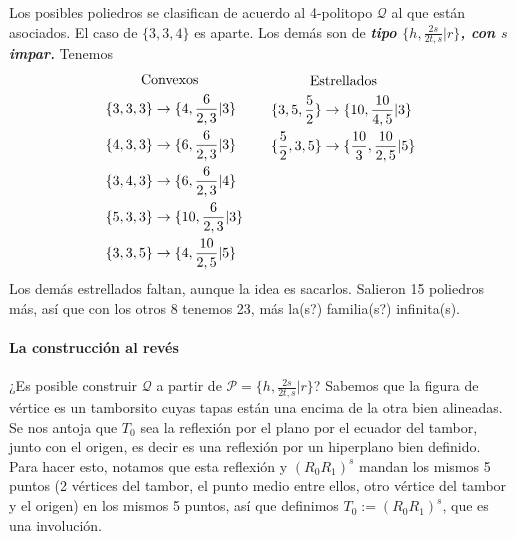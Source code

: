 \documentclass[spanish]{article}
\theoremstyle{definition}
\newcommand{\p}{\mathcal{P}}
\newcommand{\q}{\mathcal{Q}}
\begin{document}
\begin{itemize}
\begin{itemize}
	Los posibles poliedros se clasifican de acuerdo al 4-politopo $\q$ al que están asociados. El caso de $\{3,3,4\}$ es aparte. Los demás son de \textbf{\textit{tipo $\{h,\frac{2s}{2t,s}|r\}$, con $s$ impar.}} Tenemos
	\begin{align*}
		\begin{aligned}
			&\hspace{-.3cm}\text{Convexos}\\
			\{3,3,3\}&\to\{4,\frac{6}{2,3}|3\}\\
			\{4,3,3\}&\to\{6,\frac{6}{2,3}|3\}\\
			\{3,4,3\}&\to\{6,\frac{6}{2,3}|4\}\\
			\{5,3,3\}&\to\{10,\frac{6}{2,3}|3\}\\
			\{3,3,5\}&\to\{4,\frac{10}{2,5}|5\}\\
		\end{aligned}
		\qquad
		\begin{aligned}
			&\hspace{-.3cm}\text{Estrellados}\\
			\{3,5,\frac{5}{2}\}&\to\{10,\frac{10}{4,5}|3\}\\
			\{\frac{5}{2},3,5\}&\to\{\frac{10}{3},\frac{10}{2,5}|5\}\\\\\\\\\\\\
		\end{aligned}
	\end{align*}
	Los demás estrellados faltan, aunque la idea es sacarlos. Salieron 15 poliedros más, así que con los otros 8 tenemos 23, más la(s?) familia(s?) infinita(s).
\end{itemize}
\end{itemize}
\paragraph{La construcción al revés} ¿Es posible construir $\q$ a partir de $\p=\{h,\frac{2s}{2t,s}|r\}$? Sabemos que la figura de vértice es un tamborsito cuyas tapas están una encima de la otra bien alineadas. Se nos antoja que $T_0$ sea la reflexión por el plano por el ecuador del tambor, junto con el origen, es decir es una reflexión por un hiperplano bien definido. Para hacer esto, notamos que esta reflexión y $(R_0R_1)^s$ mandan los mismos 5 puntos (2 vértices del tambor, el punto medio entre ellos, otro vértice del tambor y el origen) en los mismos 5 puntos, así que definimos $T_0:=(R_0R_1)^s$, que es una involución.
\end{document}
